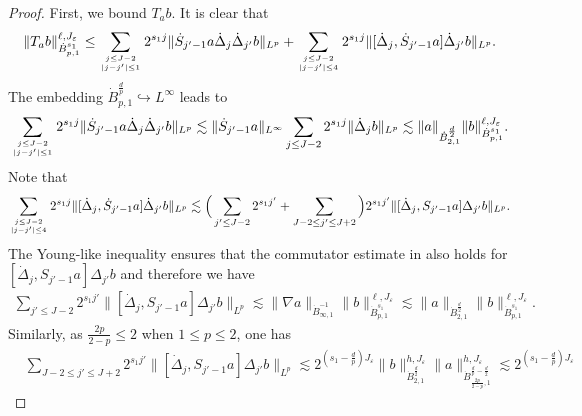\documentclass{amsart}
\theoremstyle{definition}
\theoremstyle{remark}
\numberwithin{equation}{section}
\def\ddj{\dot \Delta_j}
\def\ddjj{\dot \Delta_{j'}}
\def\dB{{\dot {B}}}
\begin{document}
\begin{proof}
First, we bound $T_{a}b$. It is clear that
\begin{equation}\nonumber
\begin{aligned}
\|T_{a} b\|_{\dB_{p,1}^{s_1}}^{\ell,J_\varepsilon}
\leq
\sum_{j\leq J-2\atop |j-j'|\leq 1}2^{s_1 j} \|\dot S_{j'-1} a \ddj \ddjj b\|_{L^p}
+\sum_{j\leq J-2\atop |j-j'|\leq 4} 2^{s_1 j}\|[\ddj, \dot S_{j'-1} a] \ddjj b\|_{L^p}.
\end{aligned}
\end{equation}
The embedding $\dot B_{p,1}^{\frac{d}{p}}\hookrightarrow L^{\infty}$ leads to
\begin{equation}\nonumber
\begin{aligned}
\sum_{j\leq J-2\atop |j-j'|\leq 1} 2^{s_1j}\|\dot S_{j'-1} a \ddj \ddjj b\|_{L^p}
\lesssim
\|\dot S_{j'-1} a\|_{L^\infty}\sum_{j\leq J-2} 2^{s_1j} \|\ddj b\|_{L^p}
\lesssim
\|a\|_{\dB_{2,1}^{\frac{d}{2}}}\|b\|_{\dB_{p,1}^{s_1}}^{\ell,J_\varepsilon}.
\end{aligned}
\end{equation}
Note that
\begin{equation}\nonumber
\begin{aligned}
\sum_{j\leq J-2\atop |j-j'|\leq 4} 2^{s_1 j}\|[\ddj, \dot S_{j'-1} a] \ddjj b\|_{L^p}
\lesssim\Big(\sum\limits_{j'\leq J-2}2^{s_1j'}
+ \sum\limits_{J -2 \leq j'\leq J+2} \Big)2^{s_1j'}
\|[\ddj, S_{j'-1} a] \Delta_{j'} b\|_{L^p}.
\end{aligned}
\end{equation}
The Young-like inequality ensures that the commutator estimate in \cite[Lemma 2.97]{chemin} also holds for $[\ddj, S_{j'-1} a] \Delta_{j'} b$
and therefore we have
\begin{equation}\nonumber
\begin{aligned}
\sum\limits_{j'\leq J-2}2^{s_1j'}
\|[\ddj, S_{j'-1} a] \Delta_{j'} b\|_{L^p}
\lesssim
\|\nabla a\|_{\dB_{\infty,1}^{-1}}
\|b\|_{\dB_{p,1}^{s_1}}^{\ell,J_\varepsilon}
\lesssim
\|a\|_{\dB_{2,1}^{\frac{d}{2}}}
\|b\|_{\dB_{p,1}^{s_1}}^{\ell,J_\varepsilon}.
\end{aligned}
\end{equation}
Similarly, as $\frac{2p}{2-p}\leq 2$ when $1\leq p\leq 2$, one has
\begin{equation}\nonumber
\begin{aligned}
&\sum\limits_{J -2 \leq j'\leq J+2}2^{s_1j'}
\|[\ddj, S_{j'-1} a] \Delta_{j'} b\|_{L^p}
\lesssim
2^{(s_1-\frac{d}{p})J_\varepsilon}
\|b\|_{\dB_{2,1}^{\frac{d}{2}}}^{h,J_\varepsilon} \|a\|_{\dB_{\frac{2p}{2-p},1}^{\frac{d}{p}-\frac{d}{2}}}^{h,J_\varepsilon}\lesssim 2^{(s_1-\frac{d}{p})J_\varepsilon}

\end{aligned}
\end{equation}
\end{proof}
\end{document}
